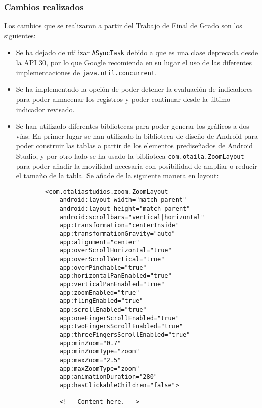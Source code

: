 \subsubsection{Cambios realizados}
Los cambios que se realizaron a partir del Trabajo de Final de Grado son los siguientes:
\begin{itemize}
    \item Se ha dejado de utilizar \texttt{ASyncTask} debido a que es una clase
    deprecada desde la API 30\cite{asynctask}, por lo que Google recomienda en su lugar el uso de las diferentes
    implementaciones de \texttt{java.util.concurrent}.
    \item Se ha implementado la opción de poder detener la evaluación de
    indicadores para poder almacenar los registros y poder continuar desde la
    último indicador revisado.
    \item Se han utilizado diferentes bibliotecas para poder generar los
    gráficos a dos vías: En primer lugar se han utilizado la biblioteca de
    diseño de Android para poder construir las tablas a partir de los elementos
    prediseñados de Android Studio, y por otro lado se ha usado la biblioteca
    \texttt{com.otaila.ZoomLayout}\cite{githubGitHubNatario1ZoomLayout} para poder añadir la movilidad necesaria con
    posibilidad de ampliar o reducir el tamaño de la tabla. Se añade de la
    siguiente manera en layout:
    \begin{lstlisting}
        <com.otaliastudios.zoom.ZoomLayout
            android:layout_width="match_parent"
            android:layout_height="match_parent"
            android:scrollbars="vertical|horizontal"   
            app:transformation="centerInside"                                
            app:transformationGravity="auto"
            app:alignment="center"
            app:overScrollHorizontal="true"
            app:overScrollVertical="true"
            app:overPinchable="true"
            app:horizontalPanEnabled="true"
            app:verticalPanEnabled="true"
            app:zoomEnabled="true"
            app:flingEnabled="true"
            app:scrollEnabled="true"
            app:oneFingerScrollEnabled="true"
            app:twoFingersScrollEnabled="true"
            app:threeFingersScrollEnabled="true"
            app:minZoom="0.7"
            app:minZoomType="zoom"
            app:maxZoom="2.5"
            app:maxZoomType="zoom"
            app:animationDuration="280"
            app:hasClickableChildren="false">

            <!-- Content here. -->


\end{lstlisting}
\end{itemize}
